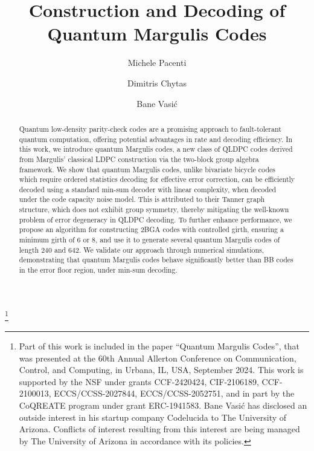 \documentclass[a4paper,twocolumn,11pt,accepted=2026-05-03]{quantumarticle}
\begin{document}
\title{Construction and Decoding of Quantum Margulis Codes}


\author{Michele Pacenti}
\thanks{Part of this work is included in the paper ``Quantum Margulis Codes'', that was presented at the 60th Annual Allerton Conference on Communication, Control, and Computing, in Urbana, IL, USA, September 2024. This work is supported by the NSF under grants CCF-2420424, CIF-2106189, CCF-2100013, ECCS/CCSS-2027844, ECCS/CCSS-2052751, and in part by the CoQREATE program under grant ERC-1941583. Bane Vasi\'{c} has disclosed an outside
interest in his startup company Codelucida to The University
of Arizona. Conflicts of interest resulting from this interest are being managed by The University of Arizona in accordance
with its policies.
}

\author{Dimitris Chytas}

\author{Bane Vasi\'c}


\maketitle

\begin{abstract}
Quantum low-density parity-check codes are a promising approach to fault-tolerant quantum computation, offering potential advantages in rate and decoding efficiency. In this work, we introduce quantum Margulis codes, a new class of QLDPC codes derived from Margulis' classical LDPC construction via the two-block group algebra framework. We show that quantum Margulis codes, unlike bivariate bicycle codes which require ordered statistics decoding for effective error correction, can be efficiently decoded using a standard min-sum  decoder with linear complexity, when decoded under the code capacity noise model. This is attributed to their Tanner graph structure, which does not exhibit group symmetry, thereby mitigating the well-known problem of error degeneracy in QLDPC decoding. To further enhance performance, we propose an algorithm for constructing 2BGA codes with controlled girth, ensuring a minimum girth of 6 or 8, and use it to generate several quantum Margulis codes of length 240 and 642. We validate our approach through numerical simulations, demonstrating that quantum Margulis codes behave significantly better than BB codes in the error floor region, under min-sum decoding.
\end{abstract}
\end{document}
